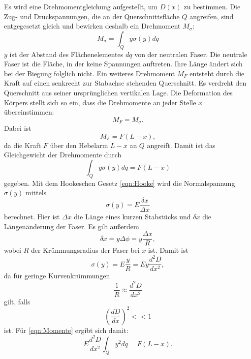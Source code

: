 Es wird eine Drehmomentgleichung aufgestellt, um $D(x)$ zu bestimmen.
Die Zug- und Druckspannungen, die an der Querschnittsfläche $Q$ angreifen,
sind entgegesetzt gleich und bewirken deshalb ein Drehmoment $M_{\sigma}$:
\begin{equation*}
M_{\sigma} = \int_{Q} y \sigma(y) dq
\end{equation*}
$y$ ist der Abstand des Flächenelementes $dq$ von der neutralen
Faser. Die neutrale Faser ist die Fläche, in der keine Spannungen
auftreten. Ihre Länge ändert sich bei der Biegung folglich nicht.
Ein weiteres Drehmoment $M_{F}$ entsteht durch die Kraft auf einen senkrecht
zur Stabachse stehenden Querschnitt. Es verdreht den Querschnitt aus 
seiner ursprünglichen vertikalen Lage.
Die Deformation des Körpers stellt sich so ein, dass die Drehmomente an
jeder Stelle $x$ übereinstimmen:
\begin{equation*}
M_{F} = M_{\sigma}.
\end{equation*}
Dabei ist
\begin{equation*}
M_{F} = F (L-x),
\end{equation*}
da die Kraft $F$ über den Hebelarm $L-x$ an $Q$ angreift.
Damit ist das Gleichgewicht der Drehmomente durch
\begin{equation}
\int_{Q} y \sigma(y) dq = F(L-x)
\label{eqn:Momente}
\end{equation}
gegeben.
Mit dem Hookeschen Gesetz \eqref{eqn:Hooke} wird die Normalspannung
$\sigma(y)$ mittels
\begin{equation*}
\sigma(y) = E \frac{\delta x}{\Delta x}
\end{equation*}
berechnet. Hier ist $\Delta x$ die Länge eines kurzen Stabstücks
und $\delta x$ die Längenänderung der Faser.
Es gilt außerdem
\begin{equation*}
\delta x = y \Delta \phi = y \frac{\Delta x}{R},
\end{equation*}
wobei $R$ der Krümmungsradius der Faser bei $x$ ist.
Damit ist
\begin{equation*}
\sigma(y) = E \frac{y}{R} = E y \frac{d^2D}{dx^2},
\end{equation*}
da für geringe Kurvenkrümmungen
\begin{equation*}
\frac{1}{R} \approx \frac{d^2D}{dx^2}
\end{equation*}
gilt, falls
\begin{equation*}
(\frac{dD}{dx})^2 << 1
\end{equation*}
ist. Für \eqref{eqn:Momente} ergibt sich damit:
\begin{equation}
E \frac{d^2D}{dx^2} \int_{Q} y^2 dq = F(L-x).
\label{eqn:Momente2}
\end{equation}
